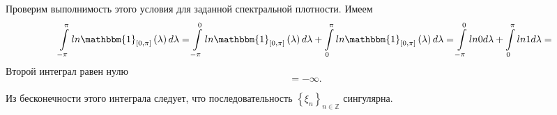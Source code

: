 Проверим выполнимость этого условия для заданной спектральной плотности.
Имеем
\begin{equation*}
  \int \limits_{-\pi }^{ \pi }
    ln \mathbbm{1}_{ \left[ 0, \pi \right] } \left( \lambda \right) d \lambda =
  \int \limits_{-\pi }^0 ln \mathbbm{1}_{ \left[ 0, \pi \right] } \left( \lambda \right) d \lambda +
  \int \limits_0^{ \pi } ln \mathbbm{1}_{ \left[ 0, \pi \right] } \left( \lambda \right) d \lambda =
  \int \limits_{-\pi }^0 ln 0 d \lambda + \int \limits_0^{ \pi } ln 1 d \lambda =
\end{equation*}
Второй интеграл равен нулю
\begin{equation*}
  = -\infty.
\end{equation*}

Из бесконечности этого интеграла следует,
что последовательность $ \left\{ \xi_n \right\}_{n \in \mathbb{Z}}$ сингулярна.
